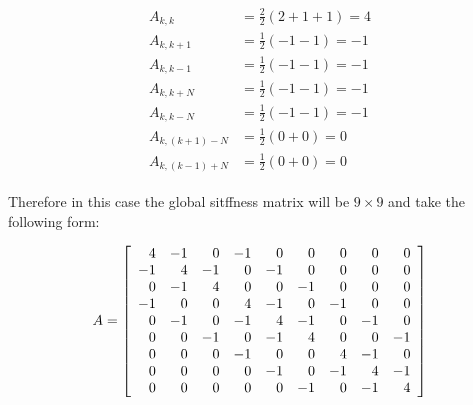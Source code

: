 \begin{align}
  \begin{split}
    A_{k,k} &= \frac{2}{2}(2 + 1 + 1) = 4 \\
    A_{k,k+1} &= \frac{1}{2}(-1 -1) = -1 \\
    A_{k,k-1} &= \frac{1}{2}(-1 -1) = -1  \\
    A_{k,k+N} &= \frac{1}{2}(-1 -1) = -1 \\
    A_{k,k-N} &= \frac{1}{2}(-1 -1) = -1 \\
    A_{k,(k+1)-N} &= \frac{1}{2}(0 + 0) = 0 \\
    A_{k,(k-1)+N} &= \frac{1}{2}(0 + 0) = 0
  \end{split}
\end{align}

Therefore in this case the global sitffness matrix will be
$9 \times 9$ and take the following form:

\begin{equation}
    A = \left[\begin{array}{r r r r r r r r r}
        4 & -1 &  0 & -1 &  0 &  0 &  0 &  0 &  0 \\
       -1 &  4 & -1 &  0 & -1 &  0 &  0 &  0 &  0 \\
        0 & -1 &  4 &  0 &  0 & -1 &  0 &  0 &  0 \\
       -1 &  0 &  0 &  4 & -1 &  0 & -1 &  0 &  0 \\
        0 & -1 &  0 & -1 &  4 & -1 &  0 & -1 &  0 \\
        0 &  0 & -1 &  0 & -1 &  4 &  0 &  0 & -1 \\
        0 &  0 &  0 & -1 &  0 &  0 &  4 & -1 &  0 \\
        0 &  0 &  0 &  0 & -1 &  0 & -1 &  4 & -1 \\
        0 &  0 &  0 &  0 &  0 & -1 &  0 & -1 & 4
    \end{array}\right]
\end{equation}
